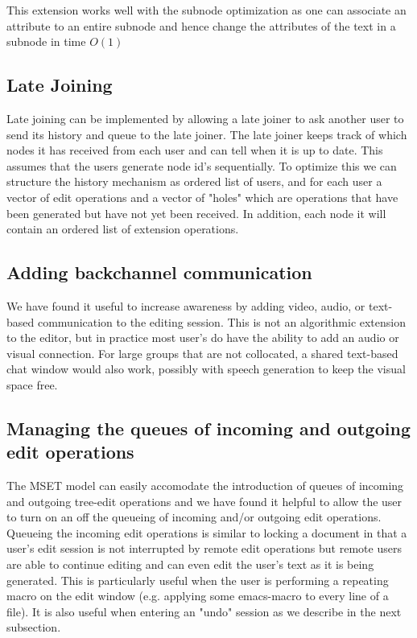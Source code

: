 \documentclass{amsart}
\begin{document}
This extension works well with the subnode optimization as one can associate
an attribute to an entire subnode and hence change the attributes of the text
in a subnode in time $O(1)$


\subsection{Late Joining}
Late joining can be implemented by allowing a late joiner to ask another
user to send its history and queue to the late joiner.  The late joiner
keeps track of which nodes it has received from each user and can tell
when it is up to date. This assumes that the users generate node id's
sequentially.  To optimize this we can structure the history mechanism
as ordered list of users, and for each user a vector of edit operations
and a vector of "holes" which are operations that have been generated but
have not yet been received.  In addition, each node it will contain an
ordered list of extension operations.

\subsection{Adding backchannel communication}
We have found it useful to increase awareness by adding video, audio, or
text-based communication to the editing session. This is not an algorithmic
extension to the editor, but in practice most user's do have the ability to
add an audio or visual connection.  For large groups that are not collocated,
a shared text-based chat window would also work, possibly with speech generation
to keep the visual space free.

\subsection{Managing the queues of incoming and outgoing edit operations}
The MSET model can easily accomodate the introduction of queues of incoming
and outgoing tree-edit operations and we have found it helpful to allow the
user to turn on an off the queueing of incoming and/or outgoing edit operations.
Queueing the incoming edit operations
is similar to locking a document in that a user's edit session is not
interrupted by remote edit operations but remote users are able to continue 
editing and can even edit the user's text as it is being generated. This
is particularly useful when the user is performing a repeating macro on
the edit window (e.g. applying some emacs-macro to every line of a file).
It is also useful when entering an "undo" session as we describe in the next subsection.
\end{document}
